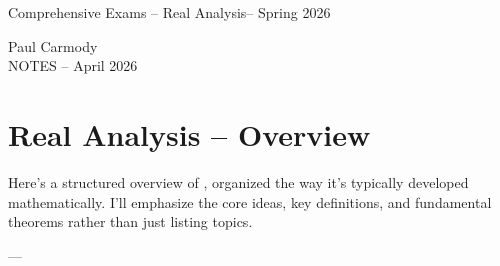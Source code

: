 \documentclass[12pt,a4paper]{report}
\newcommand{\CLASSNAME}{Comprehensive Exams -- Real Analysis}
\newcommand{\STUDENTNAME}{Paul Carmody}
\newcommand{\ASSIGNMENT}{NOTES }
\newcommand{\DUEDATE}{April 2026}
\newcommand{\SEMESTER}{Spring 2026}
\begin{document}
\begin{center}
	\Large{\CLASSNAME -- \SEMESTER} 
\end{center}
\begin{center}
	\STUDENTNAME \\
	\ASSIGNMENT -- \DUEDATE\\
\end{center} 

\section*{Real Analysis -- Overview}

Here’s a structured overview of , organized the way it’s typically developed mathematically. I’ll emphasize the core ideas, key definitions, and fundamental theorems rather than just listing topics.

---
\end{document}
